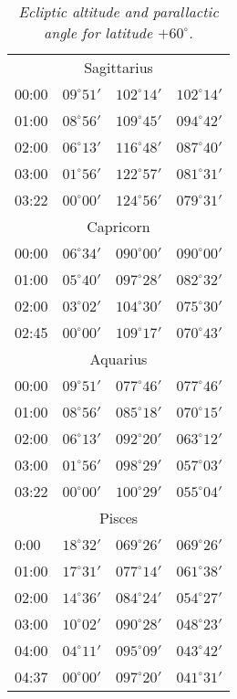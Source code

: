 \begin{table}
\begin{Parallel}{}{}
{{\begin{tabular}{l|lll}
\multicolumn{4}{c}{Sagittarius}\\
00:00 & $09^\circ 51'$ & $102^\circ 14'$& $102^\circ 14'$ \\
01:00 & $08^\circ 56'$ & $109^\circ 45'$& $094^\circ 42'$ \\
02:00 & $06^\circ 13'$ & $116^\circ 48'$& $087^\circ 40'$ \\
03:00 & $01^\circ 56'$ & $122^\circ 57'$& $081^\circ 31'$ \\
03:22 & $00^\circ 00'$ & $124^\circ 56'$& $079^\circ 31'$ \\
\multicolumn{4}{c}{Capricorn}\\
00:00 & $06^\circ 34'$ & $090^\circ 00'$& $090^\circ 00'$ \\
01:00 & $05^\circ 40'$ & $097^\circ 28'$& $082^\circ 32'$ \\
02:00 & $03^\circ 02'$ & $104^\circ 30'$& $075^\circ 30'$ \\
02:45 & $00^\circ 00'$ & $109^\circ 17'$& $070^\circ 43'$ \\
\multicolumn{4}{c}{Aquarius}\\
00:00 & $09^\circ 51'$ & $077^\circ 46'$& $077^\circ 46'$ \\
01:00 & $08^\circ 56'$ & $085^\circ 18'$& $070^\circ 15'$ \\
02:00 & $06^\circ 13'$ & $092^\circ 20'$& $063^\circ 12'$ \\
03:00 & $01^\circ 56'$ & $098^\circ 29'$& $057^\circ 03'$ \\
03:22 & $00^\circ 00'$ & $100^\circ 29'$& $055^\circ 04'$ \\
\multicolumn{4}{c}{Pisces}\\
0:00 & $18^\circ 32'$ & $069^\circ 26'$& $069^\circ 26'$ \\
01:00 & $17^\circ 31'$ & $077^\circ 14'$& $061^\circ 38'$ \\
02:00 & $14^\circ 36'$ & $084^\circ 24'$& $054^\circ 27'$ \\
03:00 & $10^\circ 02'$ & $090^\circ 28'$& $048^\circ 23'$ \\
04:00 & $04^\circ 11'$ & $095^\circ 09'$& $043^\circ 42'$ \\
04:37 & $00^\circ 00'$ & $097^\circ 20'$& $041^\circ 31'$ \\
\end{tabular}
}}
\end{Parallel}
\caption{\em Ecliptic altitude and parallactic angle for latitude $+60^\circ$.}
\end{table}

